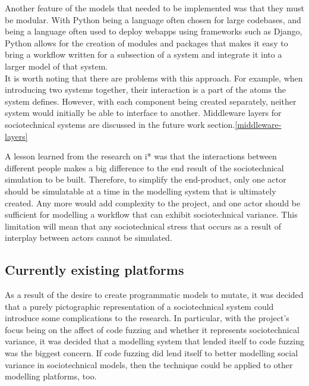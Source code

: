 Another feature of the models that needed to be implemented was that they must be modular. With Python being a language often chosen for large codebases, and being a language often used to deploy webapps using frameworks such as Django\cite{Azzopardi2016a}, Python allows for the creation of modules and packages that makes it easy to bring a workflow written for a subsection of a system and integrate it into a larger model of that system. \\
It is worth noting that there are problems with this approach. For example, when introducing two systems together, their interaction is a part of the atoms the system defines. However, with each component being created separately, neither system would initially be able to interface to another. Middleware layers for sociotechnical systems are discussed in the future work section.\cref{middleware-layers} \par%

A lesson learned from the research on i* was that the interactions between different people makes a big difference to the end result of the sociotechnical simulation to be built. Therefore, to simplify the end-product, only one actor should be simulatable at a time in the modelling system that is ultimately created. Any more would add complexity to the project, and one actor should be sufficient for modelling a workflow that can exhibit sociotechnical variance. This limitation will mean that any sociotechnical stress that occurs as a result of interplay between actors cannot be simulated. \par

\subsection{Currently existing platforms}
As a result of the desire to create programmatic models to mutate, it was decided that a purely pictographic representation of a sociotechnical system could introduce some complications to the research. In particular, with the project's focus being on the affect of code fuzzing and whether it represents sociotechnical variance, it was decided that a modelling system that lended itself to code fuzzing was the biggest concern. If code fuzzing did lend itself to better modelling social variance in sociotechnical models, then the technique could be applied to other modelling platforms, too. \par

